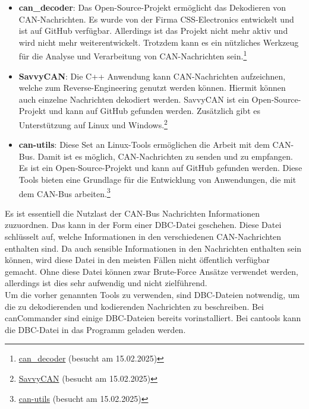 \begin{itemize}
    \item \textbf{can\_decoder}: Das Open-Source-Projekt ermöglicht das Dekodieren von CAN-Nachrichten. Es wurde von der Firma
    CSS-Electronics entwickelt und ist auf GitHub verfügbar. Allerdings ist das Projekt nicht mehr aktiv und wird nicht mehr
    weiterentwickelt. Trotzdem kann es ein nützliches Werkzeug für die Analyse und Verarbeitung von CAN-Nachrichten 
    sein.\footnote{\href{https://github.com/CSS-Electronics/can_decoder}{can\_decoder} (besucht am 15.02.2025)}
    \item \textbf{SavvyCAN}: Die C++ Anwendung kann CAN-Nachrichten aufzeichnen, welche zum Reverse-Engineering genutzt werden können.
    Hiermit können auch einzelne Nachrichten dekodiert werden. SavvyCAN ist ein Open-Source-Projekt und kann auf GitHub gefunden werden. 
    Zusätzlich gibt es Unterstützung auf Linux und Windows.\footnote{\href{https://savvycan.com/index.php}{SavvyCAN} (besucht am 15.02.2025)}
    \item \textbf{can-utils}: Diese Set an Linux-Tools ermöglichen die Arbeit mit dem CAN-Bus. Damit ist es möglich, CAN-Nachrichten 
    zu senden und zu empfangen.
    Es ist ein Open-Source-Projekt und kann auf GitHub gefunden werden. Diese Tools bieten eine Grundlage für die Entwicklung von 
    Anwendungen, die mit dem CAN-Bus arbeiten.\footnote{\href{https://github.com/linux-can/can-utils}{can-utils} (besucht am 15.02.2025)}
\end{itemize}
Es ist essentiell die Nutzlast der CAN-Bus Nachrichten Informationen zuzuordnen. Das kann in der Form einer DBC-Datei geschehen\cite{Choi2021}. 
Diese Datei schlüsselt auf, welche Informationen in den verschiedenen CAN-Nachrichten enthalten sind.
Da auch sensible Informationen in den Nachrichten enthalten sein können, wird diese Datei in den meisten 
Fällen nicht öffentlich verfügbar gemacht. Ohne diese Datei können zwar Brute-Force Ansätze verwendet werden,
allerdings ist dies sehr aufwendig und nicht zielführend. \\
Um die vorher genannten Tools zu verwenden, sind DBC-Dateien notwendig, um die zu dekodierenden und kodierenden Nachrichten zu beschreiben. 
Bei canCommander
sind einige DBC-Dateien bereits vorinstalliert. Bei cantools kann die DBC-Datei in das Programm geladen werden.